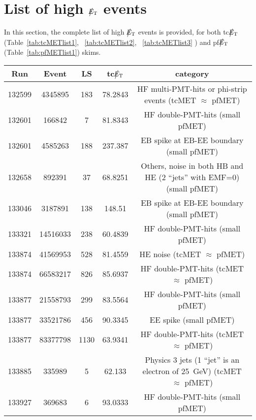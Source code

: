 \section{List of high $\big\slash\hspace{-1.6ex}{E_\text{T}}$ events}

In this section, the complete list of high $\big\slash\hspace{-1.6ex}{E_\text{T}}$ events is provided, for both tc$\big\slash\hspace{-1.6ex}{E_\text{T}}$ 
(Table~\ref{tab:tcMETlist1}, ~\ref{tab:tcMETlist2}, ~\ref{tab:tcMETlist3} ) and pf$\big\slash\hspace{-1.6ex}{E_\text{T}}$ 
(Table~\ref{tab:pfMETlist1}) skims.


\begin{table}[htbp]
  \begin{center}
    \begin{tabular}{|c|c|c|c|c|}
      \hline
      Run & Event & LS & tc$\big\slash\hspace{-1.6ex}{E_\text{T}}$ & category \\     
      \hline
      132599 & 4345895     & 183  &    78.2843  & HF multi-PMT-hits or phi-strip events (tcMET $\approx$ pfMET) \\
      132601 & 166842      & 7    &    81.8343  & HF double-PMT-hits  (small pfMET) \\
      132601 & 4585263     & 188  &    237.387  & EB spike at EB-EE boundary (small pfMET) \\
      132658 & 892391      & 37   &    68.8251  & Others, noise in both HB and HE (2 ``jets'' with EMF=0) (small pfMET) \\
      133046 & 3187891     & 138  &    148.51   & EB spike at EB-EE boundary (small pfMET) \\
      133321 & 14516033    & 238  &    60.4839  & HF double-PMT-hits  (small pfMET) \\
      133874 & 41569953    & 528  &    81.4559  & HE noise (tcMET $\approx$ pfMET) \\
      133874 & 66583217    & 826  &    85.6937  & HF double-PMT-hits  (tcMET $\approx$ pfMET) \\
      133877 & 21558793    & 299  &    83.5564  & HF double-PMT-hits  (small pfMET) \\
      133877 & 33521786    & 456  &    90.3345  & EE spike (small pfMET) \\
      133877 & 83377798    & 1130 &    63.9341  & HF double-PMT-hits  (tcMET $\approx$ pfMET) \\
      133885 & 335989      & 5    &    62.133   & Physics 3 jets (1 ``jet'' is an electron of 25~GeV) (tcMET $\approx$ pfMET) \\
      133927 & 369683      & 6    &    93.0333  & HF double-PMT-hits  (small pfMET) \\

\end{tabular}
\end{center}
\end{table}
